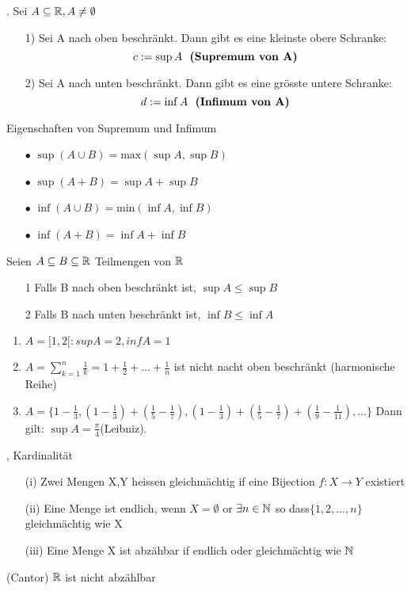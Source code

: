 \Satz[1.15]. Sei \(A \subseteq \mathbb{R}, A \neq \emptyset\)
\begin{enumerate}
\item[1)]  Sei A nach oben beschränkt. Dann gibt es eine kleinste obere Schranke: 
\[c:=\sup A \text{ \ \textbf{(Supremum von A)}}\]
\item[2)]  Sei A nach unten beschränkt. Dann gibt es eine grösste untere Schranke: 
\[d:=\inf A \text{ \ \textbf{(Infimum von A)}} \]  
\end{enumerate}

Eigenschaften von Supremum und Infimum
\begin{enumerate}
\item[\(\bullet\)]  \(\sup (A \cup B) = \text{max} (\sup A, \sup B)\)
\item[\(\bullet\)]  \(\sup (A + B) = \sup A + \sup B\)
\item[\(\bullet\)]  \(\inf (A \cup B) = \text{min} (\inf A, \inf B)\)
\item[\(\bullet\)]  \(\inf (A + B) = \inf A + \inf B\)
\end{enumerate}
\Korollar[1.16]  Seien \(A \subseteq B \subseteq \mathbb{R}\) Teilmengen von \(\mathbb{R}\)
\begin{enumerate}
    \item [1] Falls B nach oben beschränkt ist, \newline \(\sup A \leq \sup B\)
    \item [2] Falls B nach unten beschränkt ist, \newline\(\inf B \leq \inf A\)
\end{enumerate}
\Bsp[1.17]
\begin{enumerate}
    \item \( A = [1,2[: sup A = 2, inf A = 1\)
    \item \( A = \sum_{k=1}^n \frac{1}{k} = 1 + \frac{1}{2}+ \dots + \frac{1}{n}\) ist nicht nacht oben beschränkt (harmonische Reihe)
    \item \( A = \{ 1 - \frac{1}{3},(1 - \frac{1}{3})+(\frac{1}{5}-\frac{1}{7}),(1 - \frac{1}{3})+(\frac{1}{5}-\frac{1}{7})+(\frac{1}{9}-\frac{1}{11}), \dots \}\)
    Dann gilt: \( \sup A = \frac{\pi}{4}\)(Leibniz).
\end{enumerate}

\sep
\Def[1.18] Kardinalität
\begin{enumerate}
    \item [(i)] Zwei Mengen X,Y heissen gleichmächtig if eine Bijection \(f: X \rightarrow Y\) existiert
    \item [(ii)] Eine Menge ist endlich, wenn \(X = \emptyset\) or \(\exists n \in \mathbb{N}\) so dass\(\{1,2,\dots,n\}\)gleichmächtig wie X
    \item [(iii)] Eine Menge X ist abzähbar if endlich oder gleichmächtig wie \(\mathbb{N}\)
\end{enumerate}
\Satz[1.20] (Cantor) \(\mathbb{R}\) ist nicht abzählbar
